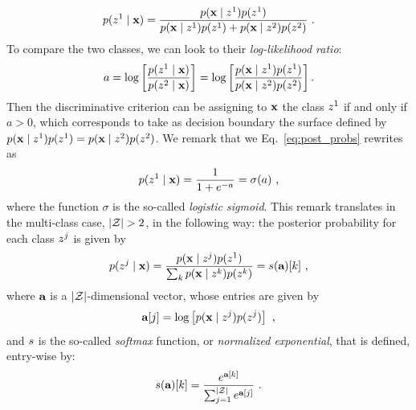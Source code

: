 \begin{equation}\label{eq:post_probs}
p(z^1\mid \textbf{x}) = \frac{p(\textbf{x}\mid z^1)p(z^1)}{p(\textbf{x}\mid z^1)p(z^1) + p(\textbf{x}\mid z^2)p(z^2)}\mbox{ .}
\end{equation}
To compare the two classes, we can look to their \emph{log-likelihood ratio}:
\begin{equation}\label{eq:log-ratio}
a = \log\left[\frac{p(z^1\mid \textbf{x})}{p(z^2\mid \textbf{x})}\right] =  \log\left[\frac{p(\textbf{x}\mid z^1)p(z^1)}{p(\textbf{x}\mid z^2)p(z^2)}\right].
\end{equation}
Then the discriminative criterion can be assigning to $\textbf{x}$ the class $z^1$ if and only if $a>0$, which corresponds to take as decision boundary the surface defined by $p(\textbf{x}\mid z^1)p(z^1) = p(\textbf{x}\mid z^2)p(z^2)$.
We remark that we Eq.~\eqref{eq:post_probs} rewrites as
\begin{equation}\label{eq:post_probs_sigmoid}
p(z^1\mid \textbf{x}) = \frac{1}{1+e^{-a}} = \sigma(a)\mbox{ ,}
\end{equation}
where the function $\sigma$ is the so-called \emph{logistic sigmoid}. This remark translates in the multi-class case, \ie $\lvert\mathcal{Z}\rvert >2$, in the following way: the posterior probability for each class $z^j$ is given by
\begin{equation}\label{eq:post_probs_multi-class}
p(z^j\mid \textbf{x}) = \frac{p(\textbf{x}\mid z^j)p(z^1)}{\sum_kp(\textbf{x}\mid z^k)p(z^k )} = s (\textbf{a})[k]\mbox{ ,}
\end{equation}
where $\textbf{a}$ is a $\lvert\mathcal{Z}\rvert$-dimensional vector, whose entries are given by
\begin{equation}
\textbf{a}[j] = \log\left[ p(\textbf{x}\mid z^j)p(z^j) \right] \mbox{ ,}
\end{equation}
and $s$ is the so-called \emph{softmax} function, or \emph{normalized exponential}, that is defined, entry-wise by:
\begin{equation}\label{eq:softmax}
s(\textbf{a})[k] = \frac{e^{\textbf{a}[k]}}{\sum_{j=1}^{\lvert\mathcal{Z}\rvert}e^{\textbf{a}[j]}}\mbox{ .}
\end{equation}

